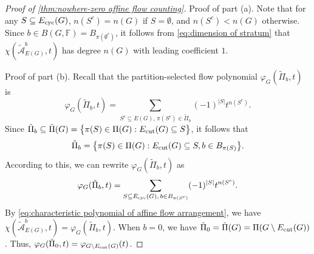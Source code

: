 \documentclass[12pt]{article}%
\renewcommand*{\bm}[1]{#1}%
\numberwithin{equation}{section}
\begin{document}
\begin{proof}[Proof of \autoref{thm:nowhere-zero affine flow counting}]
Proof of part (a). Note that for any $S\subseteq E_{\rm cyc}(G)$, $n(S^c)=n(G)$ if $S=\emptyset$, and $n(S^c)<n(G)$ otherwise. Since $\bm b\in B(G,\mathbb{F})=B_{\pi(\emptyset^c)}$, it follows from \eqref{eq:dimension of stratum} that $\chi(\tilde{\mathcal{A}}_{E(G)}^{\bm b},t)$ has degree $n(G)$ with leading coefficient $1$.

Proof of part (b). Recall that the partition-selected flow polynomial $\varphi_G(\tilde{\Pi}_{\bm b},t)$ is  \[\varphi_G(\tilde{\Pi}_{\bm b},t)=\sum_{S^c\subseteq E(G),\,\pi(S^c)\in \tilde{\Pi}_{\bm b}}(-1)^{|S|}t^{n(S^c)}.\] Since $\tilde{\Pi}_{\bm b}\subseteq\tilde{\Pi}(G)=\big\{\pi(S)\in \Pi(G):E_{\rm cut}(G)\subseteq S\big\}$, it follows that 
\[
\tilde{\Pi}_{\bm b}=\big\{\pi(S)\in \Pi(G):E_{\rm cut}(G)\subseteq S,\bm b\in B_{\pi(S)}\big\}.
\]
According to this, we can rewrite $\varphi_G(\tilde{\Pi}_{\bm b},t)$ as 
\[
\varphi_G(\tilde{\Pi}_{\bm b},t)=\sum_{S\subseteq E_{\rm cyc}(G),\,\bm b\in B_{\pi(S^c)}}(-1)^{|S|}t^{n(S^c)}.
\]
By \eqref{eq:characteristic polynomial of affine flow arrangement}, we have $\chi(\tilde{\mathcal{A}}_{E(G)}^{\bm b},t)=\varphi_G(\tilde{\Pi}_{\bm b},t)$. When $\bm b=\bm 0$, we have $\tilde{\Pi}_{\bm 0}=\tilde{\Pi}(G)=\Pi(G\setminus E_{\rm cut}(G))$. Thus, $\varphi_G(\tilde{\Pi}_{\bm 0},t)=\varphi_{G\setminus E_{\rm cut}(G)}(t)$.


\end{proof}
\end{document}
